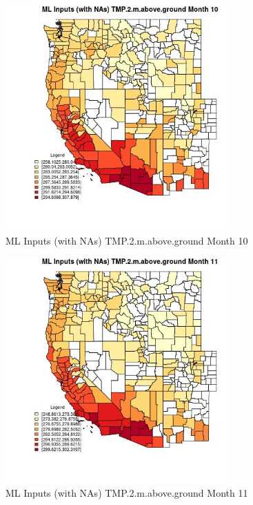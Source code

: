 \begin{figure} 
\centering  
\includegraphics[width=0.77\textwidth]{Code_Outputs/Report_ML_input_PM25_Step4_part_f_de_duplicated_aveswNAs_CountyTMP2mabovegroundmedianMonth10.jpg} 
\caption{\label{fig:Report_ML_input_PM25_Step4_part_f_de_duplicated_aveswNAsCountyTMP2mabovegroundmedianMonth10}ML Inputs (with NAs) TMP.2.m.above.ground Month 10} 
\end{figure} 
 

\begin{figure} 
\centering  
\includegraphics[width=0.77\textwidth]{Code_Outputs/Report_ML_input_PM25_Step4_part_f_de_duplicated_aveswNAs_CountyTMP2mabovegroundmedianMonth11.jpg} 
\caption{\label{fig:Report_ML_input_PM25_Step4_part_f_de_duplicated_aveswNAsCountyTMP2mabovegroundmedianMonth11}ML Inputs (with NAs) TMP.2.m.above.ground Month 11} 
\end{figure} 
 

